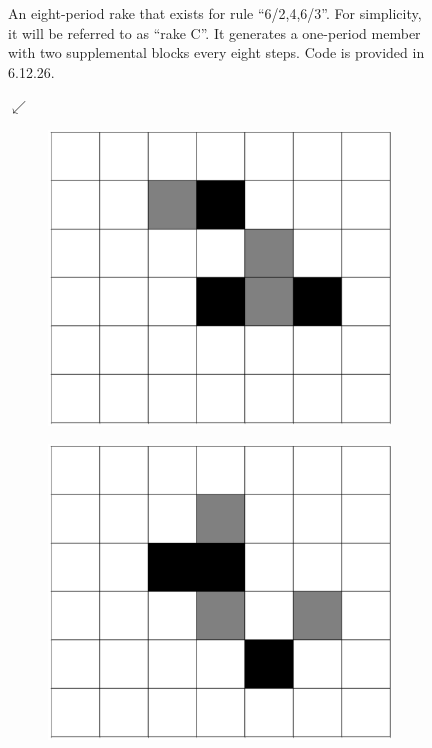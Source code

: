 \documentclass[12pt]{article}
\numberwithin{figure}{section} %
\begin{document}
\begin{figure}[H]
\begin{subfigure}{0.3\textwidth}
     \subcaption{}
   \end{subfigure}
   \setcounter{subfigure}{0}

   \caption{An eight-period rake that exists for rule “6/2,4,6/3”. For simplicity, it will be referred to as “rake C”. It generates a one-period member with two supplemental blocks every eight steps. Code is provided in 6.12.26. }
   \label{fig:eight-period rake two}
   \vspace{-1.5em}
\end{figure}

\begin{figure}[H]
      {\LARGE$\swarrow{}$}
	\begin{subfigure}{0.18\textwidth}
     	\centering
     	\includegraphics[width=\linewidth]{Section4/30.0}
     	\subcaption{}
   	\end{subfigure}
    	\begin{subfigure}{0.18\textwidth}
     	\centering
     	\includegraphics[width=\linewidth]{Section4/30.1}

\end{subfigure}
\end{figure}
\end{document}
